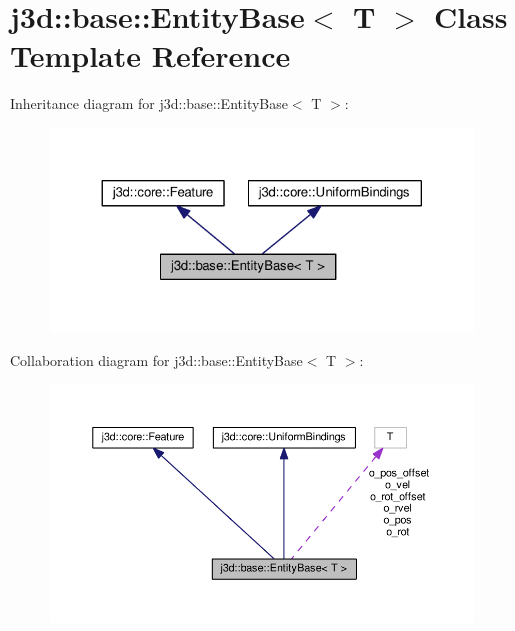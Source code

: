 \hypertarget{classj3d_1_1base_1_1EntityBase}{}\section{j3d\+:\+:base\+:\+:Entity\+Base$<$ T $>$ Class Template Reference}
\label{classj3d_1_1base_1_1EntityBase}


Inheritance diagram for j3d\+:\+:base\+:\+:Entity\+Base$<$ T $>$\+:
\nopagebreak
\begin{figure}[H]
\begin{center}
\leavevmode
\includegraphics[width=324pt]{classj3d_1_1base_1_1EntityBase__inherit__graph}
\end{center}
\end{figure}


Collaboration diagram for j3d\+:\+:base\+:\+:Entity\+Base$<$ T $>$\+:
\nopagebreak
\begin{figure}[H]
\begin{center}
\leavevmode
\includegraphics[width=350pt]{classj3d_1_1base_1_1EntityBase__coll__graph}
\end{center}
\end{figure}
